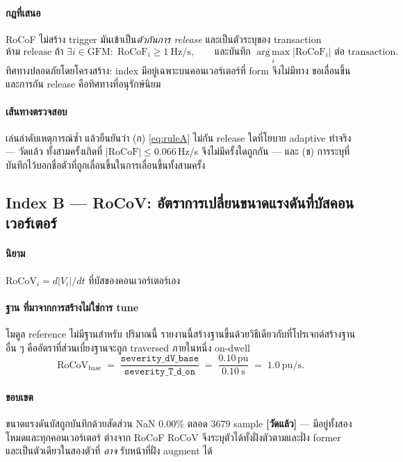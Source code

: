 \documentclass[12pt,a4paper]{article}
\theoremstyle{remark}
\newcommand{\pu}{\,\mathrm{pu}}
\newcommand{\measured}{\textcolor{ok}{\textbf{[วัดแล้ว]}}}
\begin{document}
\paragraph{กฎที่เสนอ} RoCoF ไม่สร้าง trigger มันเข้าเป็น\emph{ตัวกันการ release}
และเป็นตัวระบุของ transaction
\begin{equation}
\text{ห้าม release ถ้า } \exists i \in \mathrm{GFM}:\;
\mathrm{RoCoF}_i \ge 1\ \mathrm{Hz/s},
\qquad
\text{และบันทึก } \operatorname*{arg\,max}_i |\mathrm{RoCoF}_i|
\text{ ต่อ transaction}.
\label{eq:ruleA}
\end{equation}
ทิศทางปลอดภัยโดยโครงสร้าง: index มีอยู่เฉพาะบนคอนเวอร์เตอร์ที่ form จึงไม่มีทาง
ขอเลื่อนขึ้น และการกัน release คือทิศทางที่อนุรักษ์นิยม

\paragraph{เส้นทางตรวจสอบ} เล่นลำดับเหตุการณ์ซ้ำ แล้วยืนยันว่า (ก)
\eqref{eq:ruleA} ไม่กัน release ใดที่โยบาย adaptive ทำจริง --- วัดแล้ว
ทั้งสามครั้งเกิดที่ $|\mathrm{RoCoF}| \le 0.066$\,Hz/s จึงไม่มีครั้งใดถูกกัน ---
และ (ข) การระบุที่บันทึกไว้บอกชื่อตัวที่ถูกเลื่อนขึ้นในการเลื่อนขึ้นทั้งสามครั้ง

\subsection{Index B --- RoCoV: อัตราการเปลี่ยนขนาดแรงดันที่บัสคอนเวอร์เตอร์}

\paragraph{นิยาม} $\mathrm{RoCoV}_i = d|V_i|/dt$ ที่บัสของคอนเวอร์เตอร์เอง

\paragraph{ฐาน ที่มาจากการสร้างไม่ใช่การ tune} โมดูล reference ไม่มีฐานสำหรับ
ปริมาณนี้ รายงานนี้สร้างฐานขึ้นด้วยวิธีเดียวกับที่โปรเจกต์สร้างฐานอื่น ๆ
คืออัตราที่ส่วนเบี่ยงฐานจะถูก traversed ภายในหนึ่ง on-dwell
\begin{equation}
\mathrm{RoCoV}_{\text{base}} \;=\;
\frac{\texttt{severity\_dV\_base}}{\texttt{severity\_T\_d\_on}}
\;=\; \frac{0.10\pu}{0.10\ \mathrm{s}} \;=\; 1.0\ \mathrm{pu/s}.
\label{eq:rocovbase}
\end{equation}

\paragraph{ขอบเขต} ขนาดแรงดันบัสถูกบันทึกด้วยสัดส่วน NaN $0.00\%$ ตลอด $3679$
sample \measured{} --- มีอยู่ทั้งสองโหมดและทุกคอนเวอร์เตอร์ ต่างจาก RoCoF
RoCoV จึงระบุตัวได้ทั้งฝั่งตัวตามและฝั่ง former และเป็นตัวเดียวในสองตัวที่
\emph{อาจ} รับหน้าที่ฝั่ง augment ได้
\end{document}
